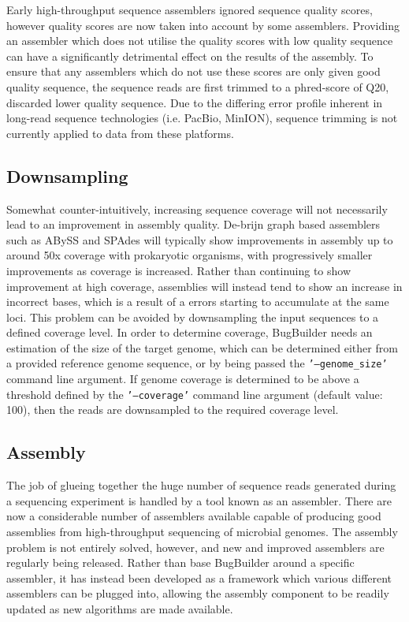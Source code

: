\documentclass[a4paper,10pt]{article}
\begin{document}
Early high-throughput sequence assemblers ignored sequence quality scores,
however quality scores are now taken into account by some assemblers. Providing
an assembler which does not utilise the quality scores with low quality
sequence can have a significantly detrimental effect on the results of the
assembly. To ensure that any assemblers which do not use these scores are only
given good quality sequence, the sequence reads are first trimmed to a
phred-score of Q20, discarded lower quality sequence. Due to the differing
error profile inherent in long-read sequence technologies (i.e. PacBio,
MinION), sequence trimming is not currently applied to data from these
platforms.

\subsection{Downsampling}

Somewhat counter-intuitively, increasing sequence coverage will not necessarily
lead to an improvement in assembly quality. De-brijn graph based assemblers
such as ABySS and SPAdes will typically show improvements in assembly up to
around 50x coverage with prokaryotic organisms, with progressively smaller
improvements as coverage is increased. Rather than continuing to show
improvement at high coverage, assemblies will instead tend to show an increase
in incorrect bases, which is a result of a errors starting to accumulate at the
same loci. This problem can be avoided by downsampling the input sequences to a
defined coverage level. In order to determine coverage, BugBuilder needs an
estimation of the size of the target genome, which can be determined either
from a provided reference genome sequence, or by being passed the
{\tt '--genome\_size'} command line argument. If genome coverage is determined to be
above a threshold defined by the {\tt '--coverage'} command line argument
(default value: 100), then the reads are downsampled to the required coverage
level.

\subsection{Assembly}

The job of glueing together the huge number of sequence reads generated during
a sequencing experiment is handled by a tool known as an assembler. There are
now a considerable number of assemblers available capable of producing good
assemblies from high-throughput sequencing of microbial genomes. The assembly
problem is not entirely solved, however, and new and improved assemblers are
regularly being released. Rather than base BugBuilder around a specific
assembler, it has instead been developed as a framework which various different
assemblers can be plugged into, allowing the assembly component to be readily
updated as new algorithms are made available.  
\end{document}
